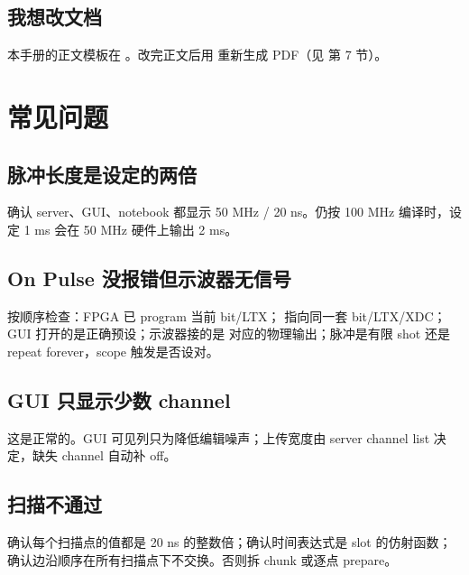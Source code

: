 \documentclass[11pt,oneside,openany]{book}
\begin{document}
\section{我想改文档}
本手册的正文模板在 。改完正文后用  重新生成 PDF（见  第 7 节）。

\chapter{常见问题}

\section{脉冲长度是设定的两倍}
确认 server、GUI、notebook 都显示 50 MHz / 20 ns。仍按 100 MHz 编译时，设定 1 ms 会在 50 MHz 硬件上输出 2 ms。

\section{On Pulse 没报错但示波器无信号}
按顺序检查：FPGA 已 program 当前 bit/LTX； 指向同一套 bit/LTX/XDC；GUI 打开的是正确预设；示波器接的是  对应的物理输出；脉冲是有限 shot 还是 repeat forever，scope 触发是否设对。

\section{GUI 只显示少数 channel}
这是正常的。GUI 可见列只为降低编辑噪声；上传宽度由 server channel list 决定，缺失 channel 自动补 off。

\section{扫描不通过}
确认每个扫描点的值都是 20 ns 的整数倍；确认时间表达式是 slot 的仿射函数；确认边沿顺序在所有扫描点下不交换。否则拆 chunk 或逐点 prepare。
\end{document}

